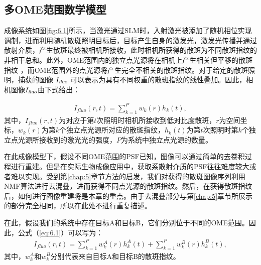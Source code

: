 \subsection{多OME范围数学模型}

成像系统如图\ref{fig:6.1}所示，当激光通过SLM时，入射激光被添加了随机相位实现调制，进而利用随机散斑照明目标后，目标产生自身的激发光，激发光传播并通过散射介质，产生散斑最终被相机所接收，此时相机所获得的散斑为不同散斑指纹的非相干总和。此外，OME范围内的独立点光源将在相机上产生相关但平移的散斑指纹 \cite{Freund1988}，而OME范围外的点光源将产生完全不相关的散斑指纹。对于给定的散斑照明，捕获的图像 $I_{\textsl{fluo}}$ 可以表示为具有不同权重的散斑指纹的线性叠加。因此，相机图像$I_{\textsl{fluo}}$由下式给出：

\begin{equation}
\begin{aligned}
I_{fluo}(r,t) = \sum^{P}_{k=1} w_{k}(r) h_{k}(t),
\label{eq:6.1}
\end{aligned}
\end{equation}
其中，$I_{fluo}(r,t)$为对应于第$t$次照明时相机所接收到低对比度散斑，$r$为空间坐标，$w_{k}(r)$为第$k$个独立点光源所对应的散斑指纹，$h_{k}(t)$为第$t$次照明时第$k$个独立点光源所接收到的激光光的强度，$P$为系统中独立点光源的数量。

在此成像模型下，假设不同OME范围的PSF已知，图像可以通过简单的去卷积过程进行重建。但是在实际生物成像应用中，获取系散射介质的PSF往往难度较大或者难以实现。受到第\ref{chap:5}章节方法的启发，我们对获得的散斑图像序列利用NMF算法进行去混叠，进而获得不同点光源的散斑指纹。然后，在获得散斑指纹后，如何进行图像重建将是本章的重点。由于去混叠部分与第\ref{chap:5}章节所展示的部分完全相同，所以在此处不进行重复描述。

在此，假设我们的系统中存在目标A和目标B，它们分别位于不同的OME范围。因此，公式（\ref{eq:6.1}）可以写为：
\begin{equation}
\begin{aligned}
I_{fluo}(r,t) = \sum^{P}_{k=1} w_{k}^{A}(r) h_{k}^{A}(t)+\sum^{P}_{k=1} w_{k}^{B}(r) h_{k}^{B}(t),
\label{eq:6.2}
\end{aligned}
\end{equation}
其中，$w_{k}^{A}$和$w_{k}^{B}$分别代表来自目标A和目标B的散斑指纹。

